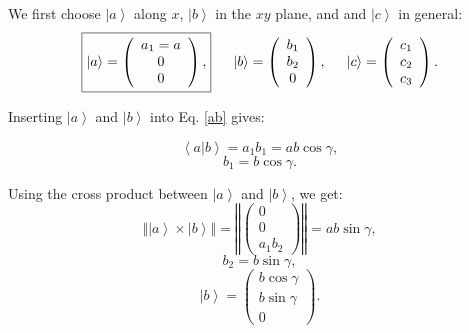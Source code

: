 We first choose $\left| a \right>$ along $x$, $\left| b \right>$ in the $xy$ plane, and and $\left| c \right>$ in general:
\begin{equation} \boxed{ \left| a \right> = \left( \begin{array}{c} a_1 = a \\ 0 \\ 0 \end{array} \right), }
\hspace{0.5cm} \left| b \right> = \left( \begin{array}{c} b_1 \\ b_2 \\ 0 \end{array} \right),
\hspace{0.5cm} \left| c \right> = \left( \begin{array}{c} c_1 \\ c_2 \\ c_3 \end{array} \right). \end{equation}


Inserting $\left| a \right>$ and $\left| b \right>$ into Eq. \ref{ab} gives:

\begin{equation} \left< a | b \right > = a_1 b_1 = ab \cos \gamma, \end{equation}
\begin{equation} b_1 = b \cos \gamma. \end{equation}


Using the cross product between $\left| a \right>$ and $\left| b \right>$, we get:
\begin{equation} \left\Vert \left| a \right> \times \left| b \right> \right\Vert =
	\left\Vert \left( \begin{array}{c} 0 \\ 0 \\ a_1 b_2 \end{array} \right) \right\Vert =
	ab \sin \gamma, \label{crossab}
\end{equation}
\begin{equation} b_2 = b \sin \gamma, \end{equation}
\begin{equation} \boxed{ \left| b \right> = \left( \begin{array}{c} b \cos \gamma \\ b \sin \gamma \\ 0 \end{array} \right). } \label{bvec} \end{equation}


